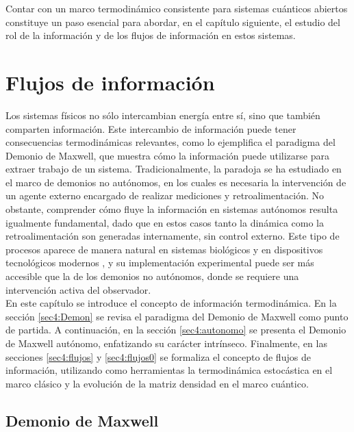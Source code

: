 Contar con un marco termodinámico consistente para sistemas cuánticos abiertos constituye un paso esencial para abordar, en el capítulo siguiente, el estudio del rol de la información y de los flujos de información en estos sistemas.

\chapter{Flujos de información} 

Los sistemas físicos no sólo intercambian energía entre sí, sino que también comparten información. Este intercambio de información puede tener consecuencias termodinámicas relevantes, como lo ejemplifica el paradigma del Demonio de Maxwell, que muestra cómo la información puede utilizarse para extraer trabajo de un sistema. Tradicionalmente, la paradoja se ha estudiado en el marco de demonios no autónomos, en los cuales es necesaria la intervención de un agente externo encargado de realizar mediciones y retroalimentación. No obstante, comprender cómo fluye la información en sistemas autónomos resulta igualmente fundamental, dado que en estos casos tanto la dinámica como la retroalimentación son generadas internamente, sin control externo. Este tipo de procesos aparece de manera natural en sistemas biológicos y en dispositivos tecnológicos modernos \cite{parrondo2023information,koski2015chip}, y su implementación experimental puede ser más accesible que la de los demonios no autónomos, donde se requiere una intervención activa del observador.
\\

En este capítulo se introduce el concepto de información termodinámica. En la sección \ref{sec4:Demon} se revisa el paradigma del Demonio de Maxwell como punto de partida. A continuación, en la sección \ref{sec4:autonomo} se presenta el Demonio de Maxwell autónomo, enfatizando su carácter intrínseco. Finalmente, en las secciones \ref{sec4:flujos} y \ref{sec4:flujos0} se formaliza el concepto de flujos de información, utilizando como herramientas la termodinámica estocástica en el marco clásico y la evolución de la matriz densidad en el marco cuántico\cite{horowitz2014thermodynamics,ptaszynski2019thermodynamics}.

\section{Demonio de Maxwell}

